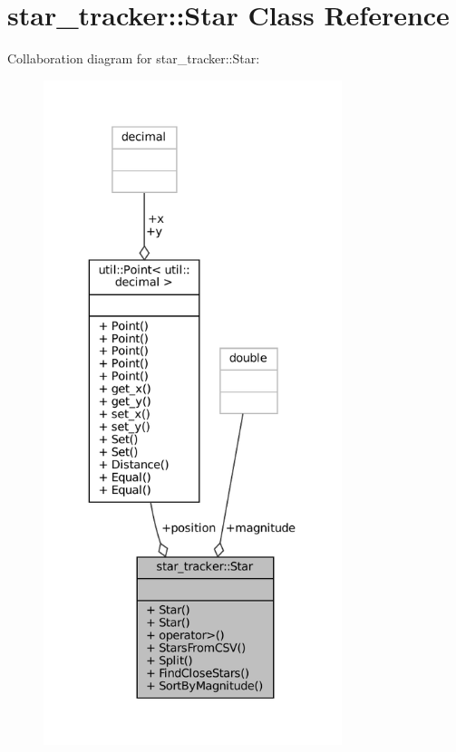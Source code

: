 \hypertarget{classstar__tracker_1_1Star}{}\section{star\+\_\+tracker\+:\+:Star Class Reference}
\label{classstar__tracker_1_1Star}


Collaboration diagram for star\+\_\+tracker\+:\+:Star\+:
\nopagebreak
\begin{figure}[H]
\begin{center}
\leavevmode
\includegraphics[height=550pt]{classstar__tracker_1_1Star__coll__graph}
\end{center}
\end{figure}
